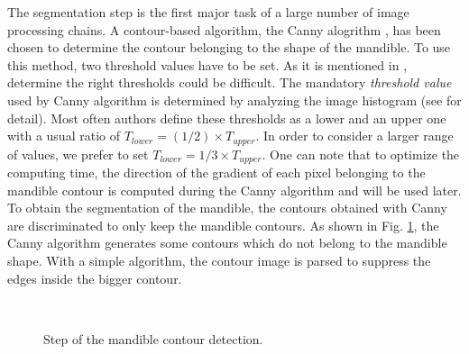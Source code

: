 \documentclass[twoside,twocolumn,10pt]{article}
\begin{document}
The segmentation step is the first major task of a large number of image processing
chains. A contour-based algorithm, the Canny alogrithm
\cite{canny1986computational}, has been chosen to determine the  contour belonging to the shape of the mandible.
To use this method, two threshold values have to be set. As it is
mentioned in \cite{adaptiveCanny}, determine the right thresholds
could be difficult. The mandatory \textit{threshold value} used by Canny algorithm is determined by analyzing the image
histogram (see \cite{leestimating} for detail). Most often authors define these thresholds as a lower and an upper one with a usual ratio of $T_{lower} = (1/2) \times T_{upper}$.
In order to consider a larger range of values, we prefer to set $T_{lower} = 1/3 \times T_{upper}$.
One can note that to optimize the computing time, the direction of the gradient of each pixel belonging to the mandible contour is computed during the Canny algorithm and will be used later.
To obtain the segmentation of the mandible, the contours obtained with Canny are discriminated to only keep the mandible contours.
As shown in Fig. \ref{canny}, the Canny algorithm generates some contours which do not belong to the mandible shape.
With a simple algorithm, the contour image is parsed to suppress the edges inside the bigger contour.
\begin{figure}[htb]
\centering
{}~~
\caption{Step of the mandible contour detection.}
\label{canny}
\end{figure}
\end{document}
